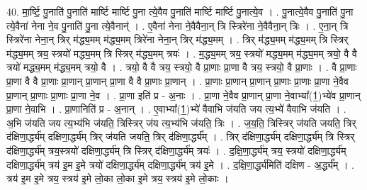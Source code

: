 \documentclass[17pt]{extarticle}
\begin{document}
40. मा॒र्ष्टि॒ पु॒नाति॑ पु॒नाति॑ मार्ष्टि मार्ष्टि पु॒ना त्ये॒वैव पु॒नाति॑ मार्ष्टि मार्ष्टि पु॒नात्ये॒व । . पु॒नात्ये॒वैव पु॒नाति॑ पु॒ना त्ये॒वैना॑ नेना ने॒व पु॒नाति॑ पु॒ना त्ये॒वैनान्॑ । . ए॒वैना॑ नेना ने॒वैवैना॒न् त्रि स्त्रिरे॑ना ने॒वैवैना॒न् त्रिः । . ए॒ना॒न् त्रि स्त्रिरे॑ना नेना॒न् त्रिर् म॑द्ध्य॒मम् म॑द्ध्य॒मम् त्रिरे॑ना नेना॒न् त्रिर् म॑द्ध्य॒मम् । . त्रिर् म॑द्ध्य॒मम् म॑द्ध्य॒मम् त्रि स्त्रिर् म॑द्ध्य॒मम् त्रय॒ स्त्रयो॑ मद्ध्य॒मम् त्रि स्त्रिर् म॑द्ध्य॒मम् त्रयः॑ । . म॒द्ध्य॒मम् त्रय॒ स्त्रयो॑ मद्ध्य॒मम् म॑द्ध्य॒मम् त्रयो॒ वै वै त्रयो॑ मद्ध्य॒मम् म॑द्ध्य॒मम् त्रयो॒ वै । . त्रयो॒ वै वै त्रय॒ स्त्रयो॒ वै प्रा॒णाः प्रा॒णा वै त्रय॒ स्त्रयो॒ वै प्रा॒णाः । . वै प्रा॒णाः प्रा॒णा वै वै प्रा॒णाः प्रा॒णान् प्रा॒णान् प्रा॒णा वै वै प्रा॒णाः प्रा॒णान् । . प्रा॒णाः प्रा॒णान् प्रा॒णान् प्रा॒णाः प्रा॒णाः प्रा॒णा ने॒वैव प्रा॒णान् प्रा॒णाः प्रा॒णाः प्रा॒णा ने॒व । . प्रा॒णा इति॑ प्र - अ॒नाः । . प्रा॒णा ने॒वैव प्रा॒णान् प्रा॒णा ने॒वाभ्या᳚(1॒)भ्ये॑व प्रा॒णान् प्रा॒णा ने॒वाभि । . प्रा॒णानिति॑ प्र - अ॒नान् । . ए॒वाभ्या᳚(1॒)भ्ये॑ वैवाभि ज॑यति जय त्य॒भ्ये॑ वैवाभि ज॑यति । . अ॒भि ज॑यति जय त्य॒भ्य॑भि ज॑यति॒ त्रिस्त्रिर् ज॑य त्य॒भ्य॑भि ज॑यति॒ त्रिः । . ज॒य॒ति॒ त्रिस्त्रिर् ज॑यति जयति॒ त्रिर् द॑क्षिणा॒र्द्ध्य॑म् दक्षिणा॒र्द्ध्य॑म् त्रिर् ज॑यति जयति॒ त्रिर् द॑क्षिणा॒र्द्ध्य᳚म् । . त्रिर् द॑क्षिणा॒र्द्ध्य॑म् दक्षिणा॒र्द्ध्य॑म् त्रि स्त्रिर् द॑क्षिणा॒र्द्ध्य॑म् त्रय॒स्त्रयो॑ दक्षिणा॒र्द्ध्य॑म् त्रि स्त्रिर् द॑क्षिणा॒र्द्ध्य॑म् त्रयः॑ । . द॒क्षि॒णा॒र्द्ध्य॑म् त्रय॒ स्त्रयो॑ दक्षिणा॒र्द्ध्य॑म् दक्षिणा॒र्द्ध्य॑म् त्रय॑ इ॒म इ॒मे त्रयो॑ दक्षिणा॒र्द्ध्य॑म् दक्षिणा॒र्द्ध्य॑म् त्रय॑ इ॒मे । . द॒क्षि॒णा॒र्द्ध्य॑मिति॑ दक्षिण - अ॒र्द्ध्य᳚म् । . त्रय॑ इ॒म इ॒मे त्रय॒ स्त्रय॑ इ॒मे लो॒का लो॒का इ॒मे त्रय॒ स्त्रय॑ इ॒मे लो॒काः । \newline
\pagebreak
{}
\end{document}
